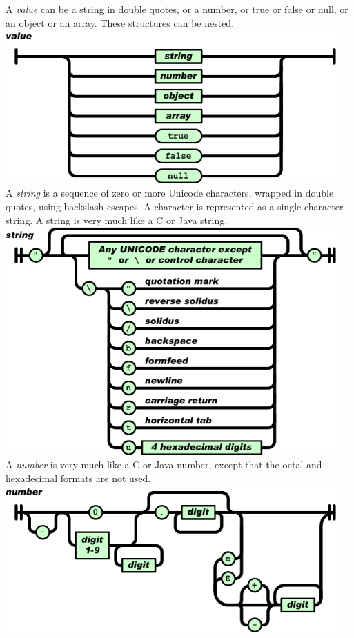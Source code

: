 \documentclass[11pt,twoside,a4paper]{article}
\begin{document}
\begin{minipage}[h]{0.70\textwidth}
	\small
	A \emph{value} can be a string in double quotes, or a number, or true or false or null, or an object or an array. These structures can be nested.~\\
	
	\includegraphics[width=0.95\textwidth]{img/value.png}~\\
	
	A \emph{string} is a sequence of zero or more Unicode characters, wrapped in double quotes, using backslash escapes. A character is represented as a single character string. A string is very much like a C or Java string.~\\
	
	\includegraphics[width=0.95\textwidth]{img/string.png}~\\
	
	A \emph{number} is very much like a C or Java number, except that the octal and hexadecimal formats are not used.~\\
	
	\includegraphics[width=0.95\textwidth]{img/number.png}~\\
	

\end{minipage}
\end{document}
